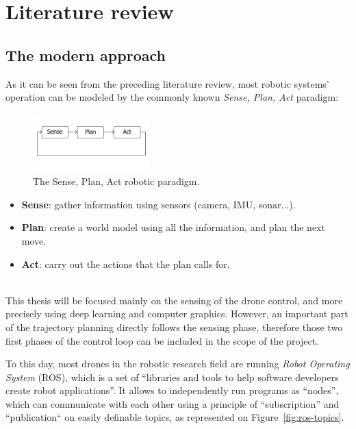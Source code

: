 \section{Literature review}


\subsection{The modern approach}
As it can be seen from the preceding literature review, most robotic systems'
operation can be modeled by the commonly known \emph{Sense, Plan, Act}
paradigm:

\begin{figure}[h]
	\centering
	\includegraphics[width=0.4\textwidth]{figure/robotic_paradigm.png}
	\caption{The Sense, Plan, Act robotic paradigm.}
	\label{fig:robotic_paradigm}
\end{figure}

\begin{itemize}
	\item{\textbf{Sense}}: gather information using sensors (camera, IMU, sonar...).
	\item{\textbf{Plan}}: create a world model using all the information, and plan
		the next move.
	\item{\textbf{Act}}: carry out the actions that the plan calls for.
\end{itemize}

~\\
This thesis will be focused mainly on the sensing of the drone control, and
more precisely using deep learning and computer graphics. However, an important
part of the trajectory planning directly follows the sensing phase, therefore
those two first phases of the control loop can be included in the scope of the
project.

To this day, most drones in the robotic research field are running \emph{Robot
Operating System} (ROS),  which is a set of ``libraries and
tools to help software developers create robot applications''. It allows to
independently run programs as ``nodes'', which can communicate with each other
using a principle of ``subscription'' and ``publication`` on easily definable
topics, as represented on Figure~\ref{fig:ros-topics}.

